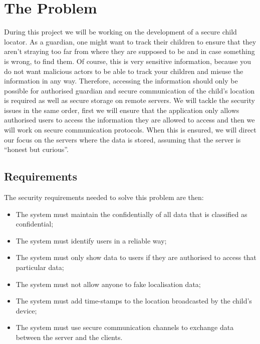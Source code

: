 \documentclass[a4paper]{article}
\begin{document}
\tableofcontents
\thispagestyle{empty}
\newpage
\setcounter{page}{1}

\pagebreak

\section{The Problem}

During this project we will be working on the development of a secure child locator. As a guardian,
one might want to track their children to ensure that they aren't straying too far from where they
are supposed to be and in case something is wrong, to find them. Of course, this is very sensitive
information, because you do not want malicious actors to be able to track your children and misuse
the information in any way. Therefore, accessing the information should only be possible for
authorised guardian and secure communication of the child's location is required as well as secure
storage on remote servers. We will tackle the security issues in the same order, first we will
ensure that the application only allows authorised users to access the information they are allowed
to access and then we will work on secure communication protocols. When this is ensured, we will
direct our focus on the servers where the data is stored, assuming that the server is
``honest but curious''.

\subsection{Requirements}

The security requirements needed to solve this problem are then:
\begin{itemize}
    \item The system must maintain the confidentially of all data that is classified as
        confidential;
    \item The system must identify users in a reliable way;
    \item The system must only show data to users if they are authorised to access that particular
        data;
    \item The system must not allow anyone to fake localisation data;
    \item The system must add time-stamps to the location broadcasted by the child's device;
    \item The system must use secure communication channels to exchange data between the server and
        the clients.
\end{itemize}
\end{document}
